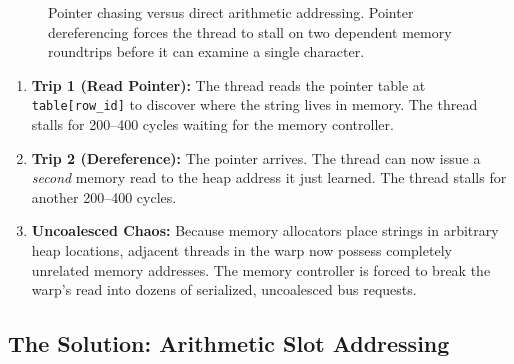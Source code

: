 \documentclass[a4paper,11pt]{article}
\begin{document}
\begin{figure}[htbp]
\centering
{}
\caption{Pointer chasing versus direct arithmetic addressing. Pointer dereferencing forces the thread to stall on two dependent memory roundtrips before it can examine a single character.}
\label{fig:pointer_indirection}
\end{figure}

\begin{enumerate}
  \item \textbf{Trip 1 (Read Pointer):} The thread reads the pointer table at \texttt{table[row\_id]} to discover where the string lives in memory. The thread stalls for 200--400 cycles waiting for the memory controller.
  \item \textbf{Trip 2 (Dereference):} The pointer arrives. The thread can now issue a \textit{second} memory read to the heap address it just learned. The thread stalls for another 200--400 cycles.
  \item \textbf{Uncoalesced Chaos:} Because memory allocators place strings in arbitrary heap locations, adjacent threads in the warp now possess completely unrelated memory addresses. The memory controller is forced to break the warp's read into dozens of serialized, uncoalesced bus requests.
\end{enumerate}

\subsection{The Solution: Arithmetic Slot Addressing}
\end{document}
